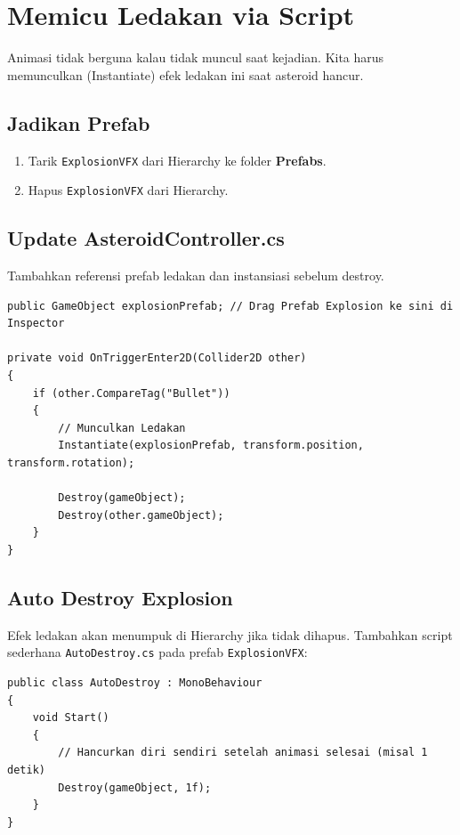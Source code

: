 
\section{Memicu Ledakan via Script}

Animasi tidak berguna kalau tidak muncul saat kejadian. Kita harus memunculkan (Instantiate) efek ledakan ini saat asteroid hancur.

\subsection{Jadikan Prefab}
\begin{enumerate}
    \item Tarik \texttt{ExplosionVFX} dari Hierarchy ke folder \textbf{Prefabs}.
    \item Hapus \texttt{ExplosionVFX} dari Hierarchy.
\end{enumerate}

\subsection{Update AsteroidController.cs}
Tambahkan referensi prefab ledakan dan instansiasi sebelum destroy.

\begin{lstlisting}[language={[Sharp]C}]
public GameObject explosionPrefab; // Drag Prefab Explosion ke sini di Inspector

private void OnTriggerEnter2D(Collider2D other)
{
    if (other.CompareTag("Bullet"))
    {
        // Munculkan Ledakan
        Instantiate(explosionPrefab, transform.position, transform.rotation);
        
        Destroy(gameObject);
        Destroy(other.gameObject);
    }
}
\end{lstlisting}

\subsection{Auto Destroy Explosion}
Efek ledakan akan menumpuk di Hierarchy jika tidak dihapus. Tambahkan script sederhana \texttt{AutoDestroy.cs} pada prefab \texttt{ExplosionVFX}:

\begin{lstlisting}[language={[Sharp]C}]
public class AutoDestroy : MonoBehaviour
{
    void Start()
    {
        // Hancurkan diri sendiri setelah animasi selesai (misal 1 detik)
        Destroy(gameObject, 1f);
    }
}
\end{lstlisting}
